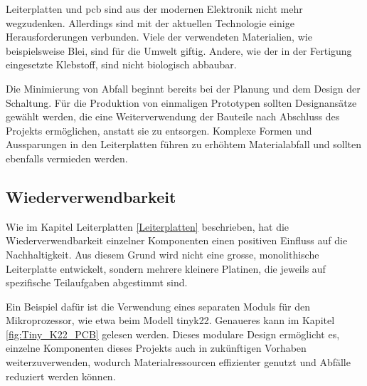 Leiterplatten und \acrfull{pcb} sind aus der modernen Elektronik nicht mehr wegzudenken. Allerdings sind mit der aktuellen Technologie einige Herausforderungen verbunden. Viele der verwendeten Materialien, wie beispielsweise Blei, sind für die Umwelt giftig. Andere, wie der in der Fertigung eingesetzte Klebstoff, sind nicht biologisch abbaubar.

Die Minimierung von Abfall beginnt bereits bei der Planung und dem Design der Schaltung. Für die Produktion von einmaligen Prototypen sollten Designansätze gewählt werden, die eine Weiterverwendung der Bauteile nach Abschluss des Projekts ermöglichen, anstatt sie zu entsorgen. Komplexe Formen und Aussparungen in den Leiterplatten führen zu erhöhtem Materialabfall und sollten ebenfalls vermieden werden.


\subsection{Wiederverwendbarkeit}

Wie im Kapitel Leiterplatten \ref{Leiterplatten} beschrieben, hat die Wiederverwendbarkeit einzelner Komponenten einen positiven Einfluss auf die Nachhaltigkeit. Aus diesem Grund wird nicht eine grosse, monolithische Leiterplatte entwickelt, sondern mehrere kleinere Platinen, die jeweils auf spezifische Teilaufgaben abgestimmt sind.

Ein Beispiel dafür ist die Verwendung eines separaten Moduls für den Mikroprozessor, wie etwa beim Modell \gls{tinyk22}. Genaueres kann im Kapitel \ref{fig:Tiny_K22_PCB} gelesen werden. Dieses modulare Design ermöglicht es, einzelne Komponenten dieses Projekts auch in zukünftigen Vorhaben weiterzuverwenden, wodurch Materialressourcen effizienter genutzt und Abfälle reduziert werden können.



